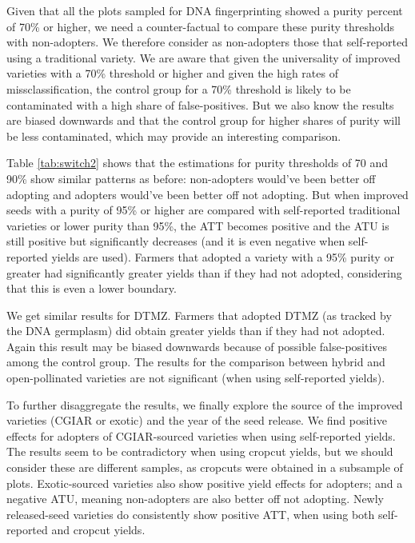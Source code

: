\documentclass{article}
\begin{document}
Given that all the plots sampled for DNA fingerprinting showed a purity percent of 70\% or higher, we need a counter-factual to compare these purity thresholds with non-adopters. We therefore consider as non-adopters those that self-reported using a traditional variety. We are aware that given the universality of improved varieties with a 70\% threshold or higher and given the high rates of missclassification, the control group for a 70\% threshold is likely to be contaminated with a high share of false-positives. But we also know the results are biased downwards and that the control group for higher shares of purity will be less contaminated, which may provide an interesting comparison. 

Table \ref{tab:switch2} shows that the estimations for purity thresholds of 70 and 90\% show similar patterns as before: non-adopters would've been better off adopting and adopters would've been better off not adopting. But when improved seeds with a purity of 95\% or higher are compared with self-reported traditional varieties or lower purity than 95\%, the ATT becomes positive and the ATU is still positive but significantly decreases (and it is even negative when self-reported yields are used). Farmers that adopted a variety with a 95\% purity or greater had significantly greater yields than if they had not adopted, considering that this is even a lower boundary. 

We get similar results for DTMZ. Farmers that adopted DTMZ (as tracked by the DNA germplasm) did obtain greater yields than if they had not adopted. Again this result may be biased downwards because of possible false-positives among the control group. The results for the comparison between hybrid and open-pollinated varieties are not significant (when using self-reported yields).



To further disaggregate the results, we finally explore the source of the improved varieties (CGIAR or exotic) and the year of the seed release. We find positive effects for adopters of CGIAR-sourced varieties when using self-reported yields. The results seem to be contradictory when using cropcut yields, but we should consider these are different samples, as cropcuts were obtained in a subsample of plots. Exotic-sourced varieties also show positive yield effects for adopters; and a negative ATU, meaning non-adopters are also better off not adopting. Newly released-seed varieties do consistently show positive ATT, when using both self-reported and cropcut yields.
\end{document}
